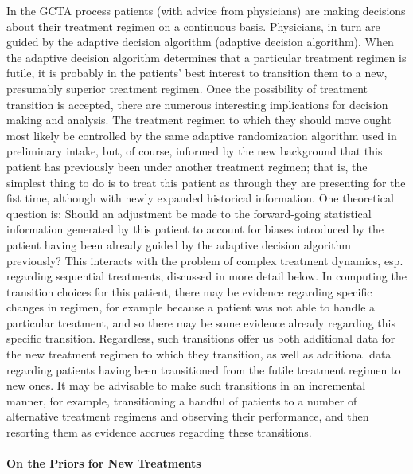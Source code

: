 \documentclass[12pt]{article}
\begin{document}
In the GCTA process patients (with advice from physicians) are making
decisions about their treatment regimen on a continuous
basis. Physicians, in turn are guided by the adaptive decision
algorithm (adaptive decision algorithm).  When the adaptive decision
algorithm determines that a particular treatment regimen is futile, it
is probably in the patients' best interest to transition them to a
new, presumably superior treatment regimen. Once the possibility of
treatment transition is accepted, there are numerous interesting
implications for decision making and analysis. The treatment regimen
to which they should move ought most likely be controlled by the same
adaptive randomization algorithm used in preliminary intake, but, of
course, informed by the new background that this patient has
previously been under another treatment regimen; that is, the simplest
thing to do is to treat this patient as through they are presenting
for the fist time, although with newly expanded historical
information. One theoretical question is: Should an adjustment be made
to the forward-going statistical information generated by this patient
to account for biases introduced by the patient having been already
guided by the adaptive decision algorithm previously? This interacts
with the problem of complex treatment dynamics, esp. regarding
sequential treatments, discussed in more detail below. In computing
the transition choices for this patient, there may be evidence
regarding specific changes in regimen, for example because a patient
was not able to handle a particular treatment, and so there may be
some evidence already regarding this specific transition. Regardless,
such transitions offer us both additional data for the new treatment
regimen to which they transition, as well as additional data regarding
patients having been transitioned from the futile treatment regimen to
new ones. It may be advisable to make such transitions in an
incremental manner, for example, transitioning a handful of patients
to a number of alternative treatment regimens and observing their
performance, and then resorting them as evidence accrues regarding
these transitions.

\paragraph*{On the Priors for New Treatments}
\end{document}
